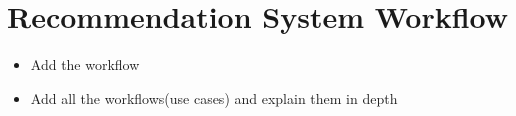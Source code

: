 \section{Recommendation System Workflow} 
\label{sec:workflow}

\begin{itemize}
	\item Add the workflow
	\item Add all the workflows(use cases) and explain them in depth
\end{itemize}